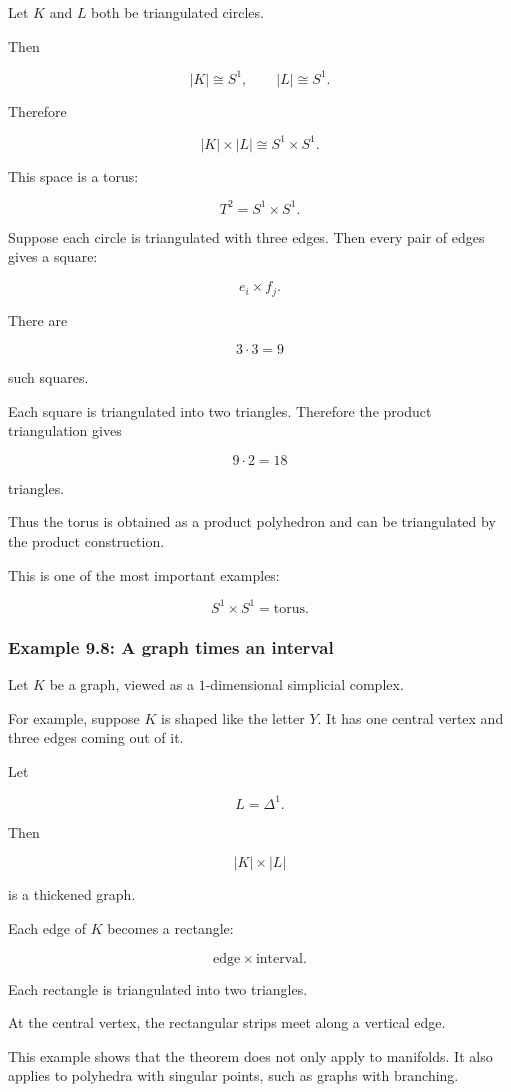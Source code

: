 \documentclass[12pt,a4paper]{article}
\theoremstyle{notespace}
\begin{document}
Let \(K\) and \(L\) both be triangulated circles.

Then

\[
|K|\cong S^1,
\qquad
|L|\cong S^1.
\]

Therefore

\[
|K|\times |L|
\cong
S^1\times S^1.
\]

This space is a torus:

\[
T^2=S^1\times S^1.
\]

Suppose each circle is triangulated with three edges. Then every pair of edges gives a square:

\[
e_i\times f_j.
\]

There are

\[
3\cdot 3=9
\]

such squares.

Each square is triangulated into two triangles. Therefore the product triangulation gives

\[
9\cdot 2=18
\]

triangles.

Thus the torus is obtained as a product polyhedron and can be triangulated by the product construction.

This is one of the most important examples:

\[
S^1\times S^1
=
\text{torus}.
\]

\subsubsection{Example 9.8: A graph times an interval}

Let \(K\) be a graph, viewed as a \(1\)-dimensional simplicial complex.

For example, suppose \(K\) is shaped like the letter \(Y\). It has one central vertex and three edges coming out of it.

Let

\[
L=\Delta^1.
\]

Then

\[
|K|\times |L|
\]

is a thickened graph.

Each edge of \(K\) becomes a rectangle:

\[
\text{edge}\times \text{interval}.
\]

Each rectangle is triangulated into two triangles.

At the central vertex, the rectangular strips meet along a vertical edge.

This example shows that the theorem does not only apply to manifolds. It also applies to polyhedra with singular points, such as graphs with branching.
\end{document}
